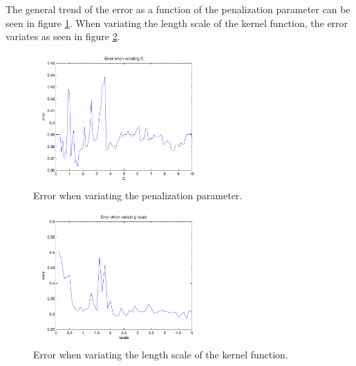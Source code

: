 The general trend of the error as a function of the penalization
parameter can be seen in figure \ref{fig:q211.4}.  When variating the
length scale of the kernel function, the error variates as seen in
figure \ref{fig:q211.5}.

\begin{figure}[!htbp]
  \centering
  \includegraphics[width=0.6\textwidth]{./images/q211_errors.pdf}
  \caption{Error when variating the penalization parameter.}
  \label{fig:q211.4}
\end{figure}
\begin{figure}[!htbp]
  \centering
  \includegraphics[width=0.6\textwidth]{./images/q211_errors_lscale.pdf}
  \caption{Error when variating the length scale of the kernel function.}
  \label{fig:q211.5}
\end{figure}
